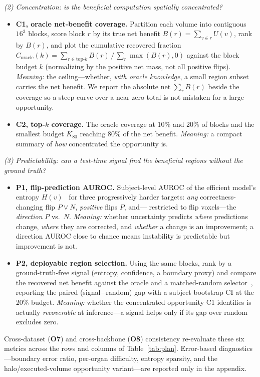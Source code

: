 \smallskip\noindent\textit{(2) Concentration: is the beneficial computation spatially
concentrated?}
\begin{itemize}\setlength\itemsep{1pt}
  \item \textbf{C1, oracle net-benefit coverage.} Partition each volume into contiguous
  $16^3$ blocks, score block $r$ by its true net benefit $B(r)=\sum_{v\in r}U(v)$, rank
  by $B(r)$, and plot the cumulative recovered fraction
  $C_{\mathrm{oracle}}(k)=\sum_{r\in\text{top-}k}B(r)\,/\,\sum_r\max(B(r),0)$ against the
  block budget $k$ (normalizing by the positive net mass, not all positive flips).
  \emph{Meaning:} the ceiling---whether, \emph{with oracle knowledge}, a small region
  subset carries the net benefit. We report the absolute net $\sum_r B(r)$ beside the
  coverage so a steep curve over a near-zero total is not mistaken for a large opportunity.
  \item \textbf{C2, top-$k$ coverage.} The oracle coverage at 10\% and 20\% of blocks
  and the smallest budget $K_{80}$ reaching 80\% of the net benefit. \emph{Meaning:} a
  compact summary of \emph{how} concentrated the opportunity is.
\end{itemize}

\smallskip\noindent\textit{(3) Predictability: can a test-time signal find the
beneficial regions without the ground truth?}
\begin{itemize}\setlength\itemsep{1pt}
  \item \textbf{P1, flip-prediction AUROC.} Subject-level AUROC of the efficient model's
  entropy $H(v)$~\cite{hendrycks2017baseline} for three progressively harder targets:
  \emph{any} correctness-changing flip $P\!\vee\!N$, \emph{positive} flips $P$, and---
  restricted to flip voxels---the \emph{direction} $P$ vs.\ $N$. \emph{Meaning:} whether
  uncertainty predicts \emph{where} predictions change, \emph{where} they are corrected,
  and \emph{whether} a change is an improvement; a direction AUROC close to chance means
  instability is predictable but improvement is not.
  \item \textbf{P2, deployable region selection.} Using the same blocks, rank by a
  ground-truth-free signal (entropy, confidence, a boundary proxy) and compare the
  recovered net benefit against the oracle and a matched-random
  selector~\cite{geifman2017selective}, reporting the paired (signal$-$random) gap with
  a subject bootstrap CI at the 20\% budget. \emph{Meaning:} whether the concentrated
  opportunity C1 identifies is actually \emph{recoverable} at inference---a signal helps
  only if its gap over random excludes zero.
\end{itemize}

\smallskip\noindent Cross-dataset (\textbf{O7}) and cross-backbone (\textbf{O8})
consistency re-evaluate these six metrics across the rows and columns of
Table~\ref{tab:plan}. Error-based diagnostics---boundary error ratio, per-organ
difficulty, entropy sparsity, and the halo/executed-volume opportunity variant---are
reported only in the appendix.

